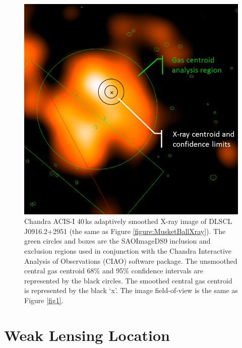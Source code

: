 \begin{figure}
\centering
\includegraphics[width=5in]{Chapter4/XrayCentRegions_reformat.png}
\caption[Musket Ball Cluster X-ray map with estimated centroid.]{
Chandra ACIS-I 40\,ks adaptively smoothed X-ray image of DLSCL J0916.2+2951 (the same as Figure \ref{figure:MusketBallXray}).
The green circles and boxes are the SAOImageDS9 inclusion and exclusion regions used in conjunction with the Chandra Interactive Analysis of Observations (CIAO) software package.
The unsmoothed central gas centroid 68\% and 95\% confidence intervals are represented by the black circles.
The smoothed central gas centroid is represented by the black `x'.
The image field-of-view is the same as Figure \ref{fig1}.
}
\label{figure:XrayCentroid}
\end{figure}


\section{Weak Lensing Location}\label{section:WLLocation}

